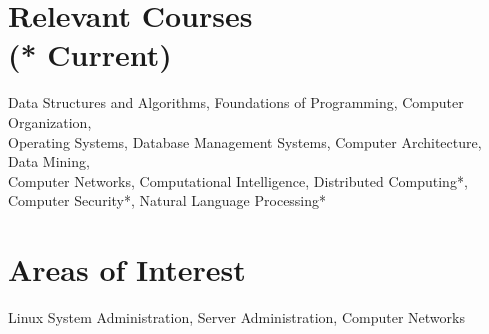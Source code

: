 \documentclass[margin, centered, 10.5pt]{res}
\begin{document}
\begin{resume}
\section{Relevant \hspace{2mm} Courses\\(* Current)}
Data Structures and Algorithms, Foundations of Programming, Computer Organization,\\Operating Systems, Database Management Systems, Computer Architecture, Data Mining,\\Computer Networks, Computational Intelligence, Distributed Computing*, Computer Security*, Natural Language Processing*




\section{Areas of \hspace{2mm} Interest}
Linux System Administration, Server Administration, Computer Networks





\end{resume}
\end{document}
